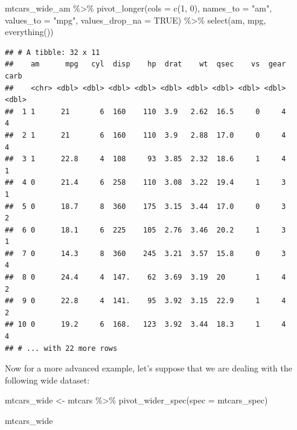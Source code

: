 \documentclass[
]{article}
\newenvironment{Shaded}{\begin{snugshade}}{\end{snugshade}}
\newcommand{\AttributeTok}[1]{\textcolor[rgb]{0.77,0.63,0.00}{#1}}
\newcommand{\ConstantTok}[1]{\textcolor[rgb]{0.00,0.00,0.00}{#1}}
\newcommand{\FunctionTok}[1]{\textcolor[rgb]{0.00,0.00,0.00}{#1}}
\newcommand{\NormalTok}[1]{#1}
\newcommand{\OtherTok}[1]{\textcolor[rgb]{0.56,0.35,0.01}{#1}}
\newcommand{\SpecialCharTok}[1]{\textcolor[rgb]{0.00,0.00,0.00}{#1}}
\newcommand{\StringTok}[1]{\textcolor[rgb]{0.31,0.60,0.02}{#1}}
\begin{document}
\begin{Shaded}
\begin{Highlighting}[]
\NormalTok{mtcars\_wide\_am }\SpecialCharTok{\%\textgreater{}\%} 
  \FunctionTok{pivot\_longer}\NormalTok{(}\AttributeTok{cols =} \FunctionTok{c}\NormalTok{(}\StringTok{\textasciigrave{}}\AttributeTok{1}\StringTok{\textasciigrave{}}\NormalTok{, }\StringTok{\textasciigrave{}}\AttributeTok{0}\StringTok{\textasciigrave{}}\NormalTok{), }\AttributeTok{names\_to =} \StringTok{"am"}\NormalTok{, }\AttributeTok{values\_to =} \StringTok{"mpg"}\NormalTok{, }\AttributeTok{values\_drop\_na =} \ConstantTok{TRUE}\NormalTok{) }\SpecialCharTok{\%\textgreater{}\%} 
  \FunctionTok{select}\NormalTok{(am, mpg, }\FunctionTok{everything}\NormalTok{())}
\end{Highlighting}
\end{Shaded}

\begin{verbatim}
## # A tibble: 32 x 11
##    am      mpg   cyl  disp    hp  drat    wt  qsec    vs  gear  carb
##    <chr> <dbl> <dbl> <dbl> <dbl> <dbl> <dbl> <dbl> <dbl> <dbl> <dbl>
##  1 1      21       6  160    110  3.9   2.62  16.5     0     4     4
##  2 1      21       6  160    110  3.9   2.88  17.0     0     4     4
##  3 1      22.8     4  108     93  3.85  2.32  18.6     1     4     1
##  4 0      21.4     6  258    110  3.08  3.22  19.4     1     3     1
##  5 0      18.7     8  360    175  3.15  3.44  17.0     0     3     2
##  6 0      18.1     6  225    105  2.76  3.46  20.2     1     3     1
##  7 0      14.3     8  360    245  3.21  3.57  15.8     0     3     4
##  8 0      24.4     4  147.    62  3.69  3.19  20       1     4     2
##  9 0      22.8     4  141.    95  3.92  3.15  22.9     1     4     2
## 10 0      19.2     6  168.   123  3.92  3.44  18.3     1     4     4
## # ... with 22 more rows
\end{verbatim}

Now for a more advanced example, let's suppose that we are dealing with the following wide dataset:

\begin{Shaded}
\begin{Highlighting}[]
\NormalTok{mtcars\_wide }\OtherTok{\textless{}{-}}\NormalTok{ mtcars }\SpecialCharTok{\%\textgreater{}\%} 
    \FunctionTok{pivot\_wider\_spec}\NormalTok{(}\AttributeTok{spec =}\NormalTok{ mtcars\_spec)}

\NormalTok{mtcars\_wide}
\end{Highlighting}
\end{Shaded}
\end{document}
